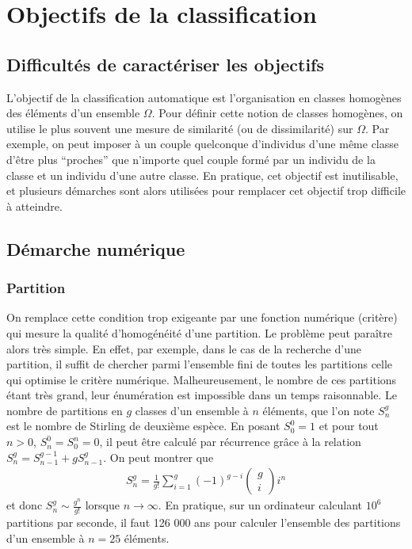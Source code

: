\documentclass[letterpaper,10pt,english]{jupyterBook}
\begin{document}
\section{Objectifs de la classification}
\label{\detokenize{clustering:objectifs-de-la-classification}}

\subsection{Difficultés de caractériser les objectifs}
\label{\detokenize{clustering:difficultes-de-caracteriser-les-objectifs}}
\sphinxAtStartPar
L’objectif de la classification automatique est l’organisation en classes homogènes des éléments d’un ensemble  \(\Omega\). Pour définir cette notion de classes homogènes, on utilise le plus souvent une mesure de similarité (ou de dissimilarité) sur  \(\Omega\). Par exemple, on peut imposer à un couple quelconque d’individus d’une même classe d’être plus “proches” que n’importe quel couple formé par un individu de la classe et un individu d’une autre classe. En pratique, cet objectif est inutilisable, et plusieurs démarches sont alors utilisées pour remplacer cet objectif trop difficile à atteindre.


\subsection{Démarche numérique}
\label{\detokenize{clustering:demarche-numerique}}

\subsubsection{Partition}
\label{\detokenize{clustering:id1}}
\sphinxAtStartPar
On remplace cette condition trop exigeante par une fonction numérique (critère) qui mesure la qualité d’homogénéité d’une partition. Le problème peut paraître alors très simple. En effet, par exemple, dans le cas de la recherche d’une partition, il suffit de chercher parmi l’ensemble fini de toutes les partitions celle qui optimise le critère numérique. Malheureusement, le nombre de ces partitions étant très grand, leur énumération est impossible dans un temps raisonnable.
Le nombre de partitions en \(g\) classes d’un ensemble à \(n\) éléments, que l’on note \(S_n^g\) est le nombre de Stirling de deuxième espèce. En posant \(S_0^0=1\) et pour tout \(n>0\), \(S_n^0=S_0^n=0\), il peut être calculé par récurrence grâce à la relation \(S_n^g=S_{n-1}^{g-1}+gS_{n-1}^g\). On peut montrer que
\begin{equation*}
\begin{split}S_n^g = \frac{1}{g!}\displaystyle\sum_{i=1}^g (-1)^{g-i}\begin{pmatrix}g\\ i \end{pmatrix}i^n\end{split}
\end{equation*}
\sphinxAtStartPar
et donc \(S_n^g\sim \frac{g^n}{g!}\) lorsque \(n\rightarrow\infty\). En pratique, sur un ordinateur calculant \(10^6\) partitions par seconde, il faut 126 000 ans pour calculer l’ensemble des partitions d’un ensemble à \(n=25\) éléments.
\end{document}
